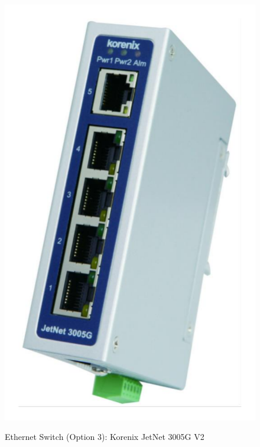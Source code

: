 \begin{figure}
  \centering
  \includegraphics[angle=90,width=1\columnwidth]{figs/body02/FIGDEVICESWITCHOPTION3.pdf}\\
  \caption[Ethernet Switch (Option 3): Korenix JetNet 3005G V2]{Ethernet Switch (Option 3): Korenix JetNet 3005G V2}
  \label{FIG:DEVICESWITCHOPTION3}
\end{figure}


